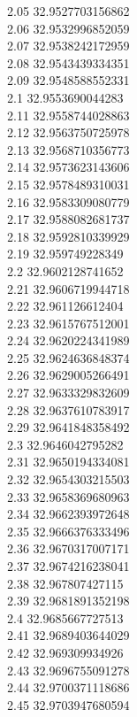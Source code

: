 {2.05	32.9527703156862\\
2.06	32.9532996852059\\
2.07	32.9538242172959\\
2.08	32.9543439334351\\
2.09	32.9548588552331\\
2.1	32.9553690044283\\
2.11	32.9558744028863\\
2.12	32.9563750725978\\
2.13	32.9568710356773\\
2.14	32.9573623143606\\
2.15	32.9578489310031\\
2.16	32.9583309080779\\
2.17	32.9588082681737\\
2.18	32.9592810339929\\
2.19	32.959749228349\\
2.2	32.9602128741652\\
2.21	32.9606719944718\\
2.22	32.961126612404\\
2.23	32.9615767512001\\
2.24	32.9620224341989\\
2.25	32.9624636848374\\
2.26	32.9629005266491\\
2.27	32.9633329832609\\
2.28	32.9637610783917\\
2.29	32.9641848358492\\
2.3	32.9646042795282\\
2.31	32.9650194334081\\
2.32	32.9654303215503\\
2.33	32.9658369680963\\
2.34	32.9662393972648\\
2.35	32.9666376333496\\
2.36	32.9670317007171\\
2.37	32.9674216238041\\
2.38	32.967807427115\\
2.39	32.9681891352198\\
2.4	32.9685667727513\\
2.41	32.9689403644029\\
2.42	32.969309934926\\
2.43	32.9696755091278\\
2.44	32.9700371118686\\
2.45	32.9703947680594\\
}
